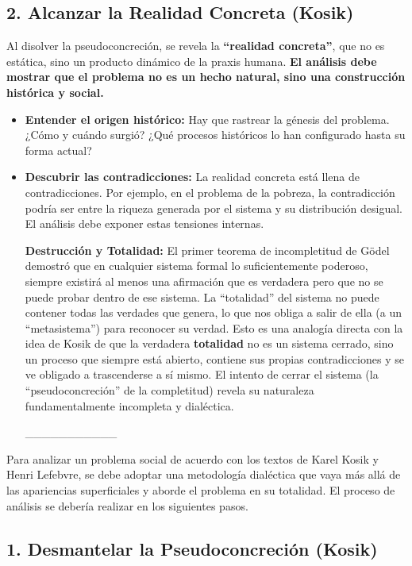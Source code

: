 \documentclass[
  letterpaper,
  DIV=11,
  numbers=noendperiod]{scrreprt}
\begin{document}
\subsection{2. Alcanzar la Realidad Concreta
(Kosik)}\label{alcanzar-la-realidad-concreta-kosik}

Al disolver la pseudoconcreción, se revela la \textbf{``realidad
concreta''}, que no es estática, sino un producto dinámico de la praxis
humana. \textbf{El análisis debe mostrar que el problema no es un hecho
natural, sino una construcción histórica y social.}

\begin{itemize}
\item
  \textbf{Entender el origen histórico:} Hay que rastrear la génesis del
  problema. ¿Cómo y cuándo surgió? ¿Qué procesos históricos lo han
  configurado hasta su forma actual?
\item
  \textbf{Descubrir las contradicciones:} La realidad concreta está
  llena de contradicciones. Por ejemplo, en el problema de la pobreza,
  la contradicción podría ser entre la riqueza generada por el sistema y
  su distribución desigual. El análisis debe exponer estas tensiones
  internas.

  \textbf{Destrucción y Totalidad:} El primer teorema de incompletitud
  de Gödel demostró que en cualquier sistema formal lo suficientemente
  poderoso, siempre existirá al menos una afirmación que es verdadera
  pero que no se puede probar dentro de ese sistema. La ``totalidad''
  del sistema no puede contener todas las verdades que genera, lo que
  nos obliga a salir de ella (a un ``metasistema'') para reconocer su
  verdad. Esto es una analogía directa con la idea de Kosik de que la
  verdadera \textbf{totalidad} no es un sistema cerrado, sino un proceso
  que siempre está abierto, contiene sus propias contradicciones y se ve
  obligado a trascenderse a sí mismo. El intento de cerrar el sistema
  (la ``pseudoconcreción'' de la completitud) revela su naturaleza
  fundamentalmente incompleta y dialéctica.

  \_\_\_\_\_\_\_\_\_\_\_
\end{itemize}

Para analizar un problema social de acuerdo con los textos de Karel
Kosik y Henri Lefebvre, se debe adoptar una metodología dialéctica que
vaya más allá de las apariencias superficiales y aborde el problema en
su totalidad. El proceso de análisis se debería realizar en los
siguientes pasos.

\subsection{1. Desmantelar la Pseudoconcreción
(Kosik)}\label{desmantelar-la-pseudoconcreciuxf3n-kosik}
\end{document}
